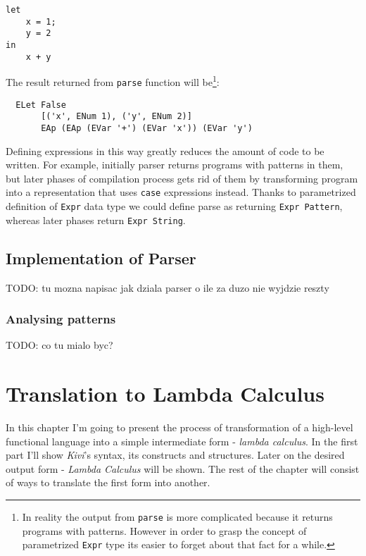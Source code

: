 \documentclass[12pt,a4paper]{report}
\begin{document}
\hspace*{-1.5in}
\begin{lstlisting}
let
    x = 1;
    y = 2
in
    x + y
\end{lstlisting}
The result returned from \texttt{parse} function will be\footnote{In reality
the output from \texttt{parse} is more complicated because it returns programs
with patterns. However in order to grasp the concept of parametrized
\texttt{Expr} type its easier to forget about that fact for a while.}:

\hspace*{-1.5in}
\begin{lstlisting}
  ELet False
       [('x', ENum 1), ('y', ENum 2)]
       EAp (EAp (EVar '+') (EVar 'x')) (EVar 'y')
\end{lstlisting}

Defining expressions in this way greatly reduces the amount of code to be
written. For example, initially parser returns programs with patterns in them,
but later phases of compilation process gets rid of them by transforming
program into a representation that uses \texttt{case} expressions instead.
Thanks to parametrized definition of \texttt{Expr} data type we could define
parse as returning \texttt{Expr Pattern}, whereas later phases return
\texttt{Expr String}.

\section{Implementation of Parser}

TODO: tu mozna napisac jak dziala parser o ile za duzo nie wyjdzie reszty

\subsection{Analysing patterns}

TODO: co tu mialo byc?


\chapter{Translation to Lambda Calculus}

In this chapter I'm going to present the process of transformation of a
high-level functional language into a simple intermediate form - \textit{lambda
calculus}. In the first part I'll show \textit{Kivi}'s syntax, its
constructs and structures. Later on the desired output form -
\textit{Lambda Calculus} will be shown. The rest of the chapter will
consist of ways to translate the first form into another.
\end{document}
